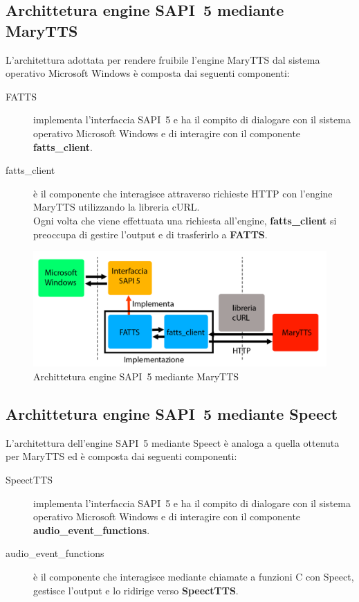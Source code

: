 \subsection{Archittetura engine SAPI~5 mediante MaryTTS}
L'architettura adottata per rendere fruibile l'engine MaryTTS dal sistema operativo Microsoft Windows è composta dai seguenti componenti:
\begin{description}
	\item[FATTS] implementa l'interfaccia SAPI~5 e ha il compito di dialogare con il sistema operativo Microsoft Windows e di interagire con il componente \textbf{fatts\_client}.
	\item[fatts\_client] è il componente che interagisce attraverso richieste HTTP con l'engine MaryTTS utilizzando la libreria cURL.\\
	Ogni volta che viene effettuata una richiesta all'engine, \textbf{fatts\_client} si preoccupa di gestire l'output e di trasferirlo a \textbf{FATTS}.
\end{description}

\begin{figure}[H]
	\centering
	\includegraphics[width=\textwidth]{images/FATTS-sapi5.png}
	\caption{Archittetura engine SAPI~5 mediante MaryTTS}
\end{figure}

\subsection{Archittetura engine SAPI~5 mediante Speect}
L'architettura dell'engine SAPI~5 mediante Speect è analoga a quella ottenuta per MaryTTS ed è composta dai seguenti componenti: 
\begin{description}
	\item[SpeectTTS] implementa l'interfaccia SAPI~5 e ha il compito di dialogare con il sistema operativo Microsoft Windows e di interagire con il componente \textbf{audio\_event\_functions}.
	\item[audio\_event\_functions] è il componente che interagisce mediante chiamate a funzioni C con Speect, gestisce l'output e lo ridirige verso \textbf{SpeectTTS}. 
\end{description}

